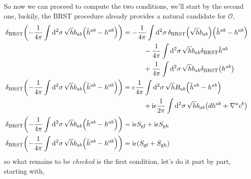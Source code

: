 So now we can proceed to compute the two conditions, we'll start by the second one, luckily, the BRST procedure already provides a natural candidate for $\mathcal O$,
\begin{align*}
    \delta_{\textnormal{BRST}}\qty(-\frac{1}{4\pi}\int\dd[2]{\sigma}\sqrt{h}b_{ab}\qty(\hat h^{ab}-h^{ab}))&=-\frac{1}{4\pi}\int\dd[2]{\sigma}\delta_{\textnormal{BRST}}\qty(\sqrt{h}b_{ab})\qty(\hat h^{ab}-h^{ab})\\
    &\quad\quad\quad-\frac{1}{4\pi}\int\dd[2]{\sigma}\sqrt{h}b_{ab}\delta_{\textnormal{BRST}}\hat h^{ab}\\
    &\quad\quad\quad+\frac{1}{4\pi}\int\dd[2]{\sigma}\sqrt{h}b_{ab}\delta_{\textnormal{BRST}}\qty(h^{ab})\\
    \delta_{\textnormal{BRST}}\qty(-\frac{1}{4\pi}\int\dd[2]{\sigma}\sqrt{h}b_{ab}\qty(\hat h^{ab}-h^{ab}))&=\epsilon\frac{1}{4\pi}\int\dd[2]{\sigma}\sqrt{h}B_{ab}\qty(\hat h^{ab}-h^{ab})\\
    &\quad\quad\quad+\textnormal{i}\epsilon\frac{1}{2\pi}\int\dd[2]{\sigma}\sqrt{h}b_{ab}\qty(dh^{ab}+\nabla^{a}c^{b})\\
    \delta_{\textnormal{BRST}}\qty(-\frac{1}{4\pi}\int\dd[2]{\sigma}\sqrt{h}b_{ab}\qty(\hat h^{ab}-h^{ab}))&=\textnormal{i}\epsilon S_{\textnormal{gf}}+\textnormal{i}\epsilon S_{\textnormal{gh}}\\
    \delta_{\textnormal{BRST}}\qty(-\frac{1}{4\pi}\int\dd[2]{\sigma}\sqrt{h}b_{ab}\qty(\hat h^{ab}-h^{ab}))&=\textnormal{i}\epsilon \qty(S_{\textnormal{gf}}+S_{\textnormal{gh}})
\end{align*}
so what remains to be \textit{checked} is the first condition, let's do it part by part, starting with, 
